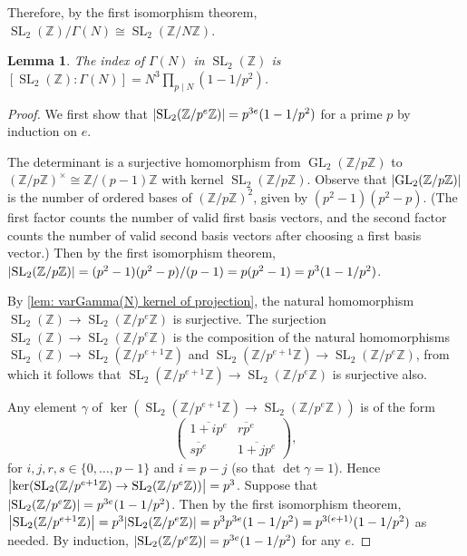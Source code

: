 \documentclass[10pt,leqno]{article}
\theoremstyle{plain}
\newtheorem{lemma}[lem]{Lemma}
\theoremstyle{definition}
\numberwithin{equation}{section}
\numberwithin{lem}{section}
\DeclareMathOperator{\GL}{GL}
\DeclareMathOperator{\SL}{SL}
\newcommand{\slz}{\SL_2(\mathbb{Z})}
\begin{document}
Therefore, by the first isomorphism theorem, $\slz/\varGamma(N)\cong \SL_2(\mathbb{Z}/N\mathbb{Z})$. 
\begin{lemma}
    The index of $\varGamma(N)$ in $\slz$ is $[\slz: \varGamma(N)] = N^3\prod_{p\mid N}(1-1/p^2)$.
\end{lemma}
\begin{proof}
    We first show that $\abs{\SL_2(\mathbb{Z}/p^e\mathbb{Z})} = p^{3e}(1-1/p^2)$ for a prime $p$ by induction on $e$.

    The determinant is a surjective homomorphism from $\GL_2(\mathbb{Z}/p\mathbb{Z})$ to $(\mathbb{Z}/p\mathbb{Z})^\times\cong \mathbb{Z}/(p-1)\mathbb{Z}$ with kernel $\SL_2(\mathbb{Z}/p\mathbb{Z})$. Observe that $\abs{\GL_2(\mathbb{Z}/p\mathbb{Z})}$ is the number of ordered bases of $(\mathbb{Z}/p\mathbb{Z})^2$, given by $(p^2-1)(p^2-p)$. (The first factor counts the number of valid first basis vectors, and the second factor counts the number of valid second basis vectors after choosing a first basis vector.) Then by the first isomorphism theorem, $\abs{\SL_2(\mathbb{Z}/p\mathbb{Z})} = (p^2-1)(p^2-p)/(p-1) = p(p^2-1) = p^3(1-1/p^2)$.
    
    By \cref{lem: varGamma(N) kernel of projection}, the natural homomorphism $\slz\to \SL_2(\mathbb{Z}/p^e\mathbb{Z})$ is surjective. The surjection $\slz\to \SL_2(\mathbb{Z}/p^e\mathbb{Z})$ is the composition of the natural homomorphisms $\slz\to \SL_2(\mathbb{Z}/p^{e+1}\mathbb{Z})$ and $\SL_2(\mathbb{Z}/p^{e+1}\mathbb{Z})\to \SL_2(\mathbb{Z}/p^e\mathbb{Z})$, from which it follows that $\SL_2(\mathbb{Z}/p^{e+1}\mathbb{Z})\to \SL_2(\mathbb{Z}/p^e\mathbb{Z})$ is surjective also.

    Any element $\gamma$ of $\ker(\SL_2(\mathbb{Z}/p^{e+1}\mathbb{Z})\to \SL_2(\mathbb{Z}/p^e\mathbb{Z}))$ is of the form
    \[\begin{pmatrix}
        \overline{1+ip^e} & \overline{rp^e} \\ \overline{sp^e} & \overline{1+jp^e}
    \end{pmatrix},\] for $i,j,r,s\in \{0,\dots,p-1\}$ and $i = p-j$ (so that $\det \gamma = 1$). Hence $\abs{\ker(\SL_2(\mathbb{Z}/p^{e+1}\mathbb{Z})\to \SL_2(\mathbb{Z}/p^e\mathbb{Z}))} = p^3$. Suppose that $\abs{\SL_2(\mathbb{Z}/p^e\mathbb{Z})} = p^{3e}(1-1/p^2)$. Then by the first isomorphism theorem, $\abs{\SL_2(\mathbb{Z}/p^{e+1}\mathbb{Z})} = p^3\abs{\SL_2(\mathbb{Z}/p^e\mathbb{Z})} = p^3p^{3e}(1-1/p^2) = p^{3(e+1)}(1-1/p^2)$ as needed. By induction, $\abs{\SL_2(\mathbb{Z}/p^e\mathbb{Z})} = p^{3e}(1-1/p^2)$ for any $e$.


\end{proof}
\end{document}

